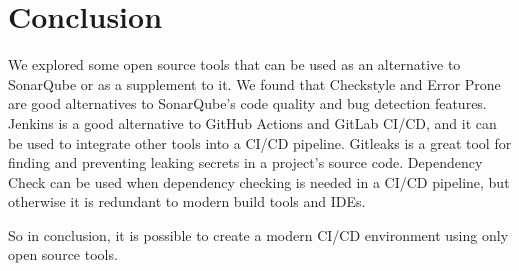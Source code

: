 \section{Conclusion}\label{sec:conclusion}

We explored some open source tools that can be used as an alternative to SonarQube or as a supplement to it.
We found that Checkstyle and Error Prone are good alternatives to SonarQube's code quality and bug detection features.
Jenkins is a good alternative to GitHub Actions and GitLab CI/CD, and it can be used to integrate other tools into a CI/CD pipeline.
Gitleaks is a great tool for finding and preventing leaking secrets in a project's source code.
Dependency Check can be used when dependency checking is needed in a CI/CD pipeline, but otherwise it is redundant to modern build tools and IDEs.

So in conclusion, it is possible to create a modern CI/CD environment using only open source tools.